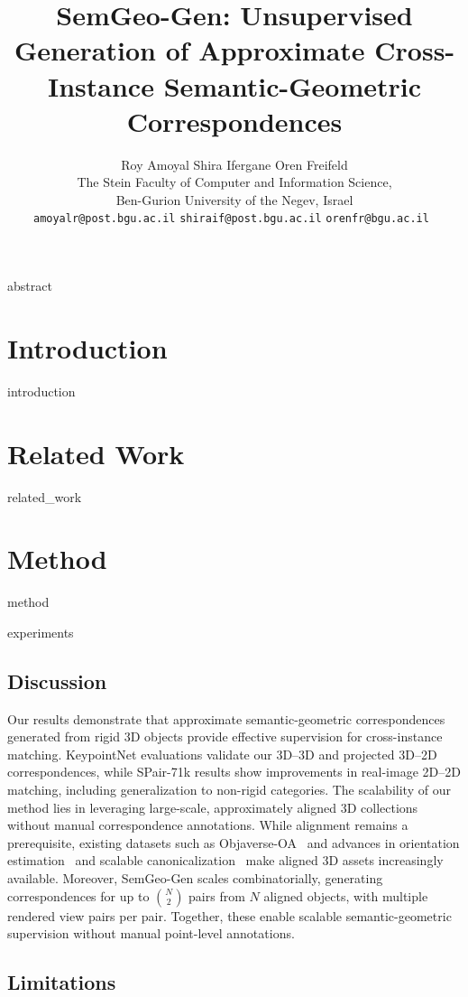 \documentclass{article}
\title{SemGeo-Gen: Unsupervised Generation of Approximate Cross-Instance Semantic-Geometric Correspondences}
\author{
  Roy Amoyal \qquad Shira Ifergane \qquad Oren Freifeld \\[7pt]
  \small The Stein Faculty of Computer and Information Science, \\
  \small Ben-Gurion University of the Negev, Israel \\[4pt]
  \small \texttt{amoyalr@post.bgu.ac.il} \qquad
  \small \texttt{shiraif@post.bgu.ac.il}
  \qquad
  \small \texttt{orenfr@bgu.ac.il }
}
\begin{document}
\maketitle
{abstract}


\section{Introduction}
{introduction}

\section{Related Work}
{related_work}

\section{Method}
\label{sec:method}
{method}

{experiments}

\subsection{Discussion}

Our results demonstrate that approximate semantic-geometric
correspondences generated from rigid 3D objects provide effective
supervision for cross-instance matching. KeypointNet evaluations
validate our 3D--3D and projected 3D--2D correspondences,
while SPair-71k results show improvements in real-image
2D--2D matching, including generalization to non-rigid categories. The scalability of our method lies in leveraging large-scale,
approximately aligned 3D collections without manual correspondence
annotations. While alignment remains a prerequisite, existing
datasets such as Objaverse-OA~\cite{lu2025orientationmatters} and advances
in orientation estimation~\cite{orient_anything} and scalable canonicalization~\cite{jin2025oneshot,jin2026canoverse}
make aligned 3D assets increasingly available.
Moreover, SemGeo-Gen scales combinatorially, generating
correspondences for up to $\binom{N}{2}$ pairs from $N$
aligned objects, with multiple rendered view pairs per pair.
Together, these enable scalable semantic-geometric supervision
without manual point-level annotations.



\subsection{Limitations}
\end{document}

